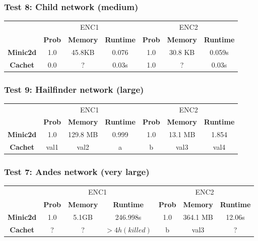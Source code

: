 \subsubsection{Test 8: Child network (medium)}
\begin{table}[H]
    \centering
    \begin{tabular}{c|c|c|c|c|c|c|}
    \cline{2-7}
            & \multicolumn{3}{c|}{ENC1} & \multicolumn{3}{c|}{ENC2} \\ \cline{2-7}
      & \textbf{Prob}  & \textbf{Memory}  & \textbf{Runtime} & \textbf{Prob}  & \textbf{Memory}  & \textbf{Runtime} \\ \cline{1-7}
      \textbf{Minic2d} & 1.0  & 45.8KB    & 0.076   & 1.0    & 30.8 KB    & 	0.059s \\
      \hline
    \textbf{Cachet}  & 0.0  & ?    & 0.03s      & 1.0     & ?    & 0.03s    \\ \cline{1-7}
    \end{tabular}
\end{table}

\subsubsection{Test 9: Hailfinder network (large)}
\begin{table}[H]
    \centering
    \begin{tabular}{c|c|c|c|c|c|c|}
    \cline{2-7}
            & \multicolumn{3}{c|}{ENC1} & \multicolumn{3}{c|}{ENC2} \\ \cline{2-7}
      & \textbf{Prob}  & \textbf{Memory}  & \textbf{Runtime} & \textbf{Prob}  & \textbf{Memory}  & \textbf{Runtime} \\ \cline{1-7}
      \textbf{Minic2d} & 1.0  & 129.8 MB & 0.999   & 1.0    & 13.1 MB    & 	1.854 \\
      \hline
    \textbf{Cachet}  & val1  & val2    & a       & b     & val3    & val4    \\ \cline{1-7}
    \end{tabular}
\end{table}

\subsubsection{Test 7: Andes network (very large)}
\begin{table}[H]
    \centering
    \begin{tabular}{c|c|c|c|c|c|c|}
    \cline{2-7}
            & \multicolumn{3}{c|}{ENC1} & \multicolumn{3}{c|}{ENC2} \\ \cline{2-7}
      & \textbf{Prob}  & \textbf{Memory}  & \textbf{Runtime} & \textbf{Prob}  & \textbf{Memory}  & \textbf{Runtime} \\ \cline{1-7}
      \textbf{Minic2d} & 1.0  & 5.1GB    & 246.998s   & 1.0    & 364.1 MB    & 	12.06s \\
      \hline
    \textbf{Cachet}  & ?  & ?    & $> 4h (killed)$      & b     & val3    & ?    \\ \cline{1-7}
    \end{tabular}
\end{table}


